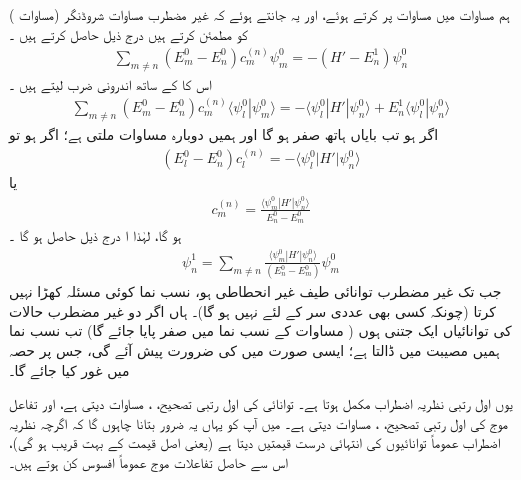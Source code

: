   ہم مساوات    میں مساوات    پر کرتے ہوئے، اور  یہ جانتے ہوئے کہ غیر مضطرب مساوات  شروڈنگر   (مساوات )  کو  مطمئن کرتے ہیں درج ذیل حاصل کرتے ہیں ۔
\begin{align*}
\sum_{m \ne n} {(E_m^0 - E_n^0) c_m^{(n)} \psi_m^0} = - {(H' - E_n^1) \psi_n^0}
\end{align*}
اس کا  کے ساتھ اندرونی ضرب لیتے ہیں ۔
\begin{align*}
\sum_{m \ne n} (E_m^0 - E_n^0) c_m^{(n)} \langle \psi_l^0 | \psi_m^0 \rangle = - \langle \psi_l^0 | H' | \psi_n^0 \rangle + E_n^1 \langle \psi_l^0 | \psi_n^0 \rangle 
\end{align*}
اگر  ہو تب بایاں ہاتھ صفر ہو گا اور ہمیں دوبارہ مساوات    ملتی ہے؛  اگر  ہو تو 
\begin{align*}
(E_l^0 - E_n^0) c_l^{(n)} = - \langle \psi_l^0 | H' | \psi_n^0 \rangle
\end{align*}
یا 
\begin{align}\label{مساوات_غیر_اضطراب_عددی_سر_ایم}
c_m^{(n)} = \frac{\langle \psi_m^0 | H' | \psi_n^0 \rangle}{E_n^0 - E_m^0}
\end{align}
ہو گا،  لہٰذا ا درج ذیل حاصل ہو گا ۔
\begin{align}\label{مساوات_غیر_اضطراب_تفاعل_این}
\psi_n^1 = \sum_{m \ne n} \frac{\langle \psi_m^0 | H' | \psi_n^0 \rangle}{(E_n^0 - E_m^0)} \psi_m^0
\end{align}
جب تک غیر مضطرب توانائی طیف غیر انحطاطی ہو،   نسب نما  کوئی  مسئلہ کھڑا نہیں کرتا   (چونکہ کسی بھی عددی سر کے لئے   نہیں ہو گا)۔  ہاں  اگر  دو غیر مضطرب حالات کی توانائیاں ایک  جتنی ہوں   ( مساوات    کے  نسب نما میں صفر پایا جائے گا)  تب نسب نما  ہمیں مصیبت میں ڈالتا ہے؛  ایسی صورت میں  کی ضرورت پیش آئے گی، جس پر حصہ  میں غور کیا جائے گا۔ 

 یوں اول رتبی  نظریہ اضطراب مکمل ہوتا ہے۔  توانائی کی اول رتبی تصحیح،  ،  مساوات    دیتی ہے،  اور  تفاعل موج کی اول رتبی  تصحیح،  ،  مساوات  دیتی ہے۔ میں آپ کو یہاں یہ ضرور بتانا چاہوں گا کہ اگرچہ نظریہ اضطراب عموماً  توانائیوں کی انتہائی  درست قیمتیں دیتا ہے  (یعنی   اصل قیمت  کے بہت قریب ہو گی)،  اس سے حاصل تفاعلات موج عموماً   افسوس  کن  ہوتے ہیں۔  

